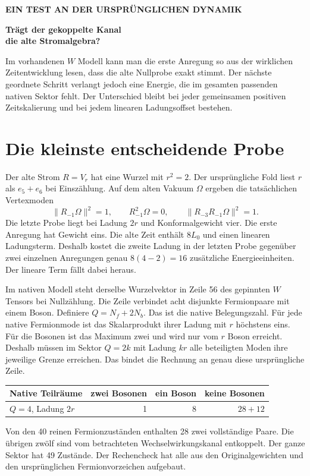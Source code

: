\documentclass[11pt,a4paper]{article}
\begin{document}
{\sffamily\bfseries\color{pine} EIN TEST AN DER URSPRÜNGLICHEN DYNAMIK\par}
\vspace{4mm}
{\sffamily\bfseries\fontsize{26}{30}\selectfont Trägt der gekoppelte Kanal\\ die alte Stromalgebra?\par}
\vspace{4mm}
Im vorhandenen $W$ Modell kann man die erste Anregung so aus der wirklichen Zeitentwicklung lesen, dass die alte Nullprobe exakt stimmt. Der nächste geordnete Schritt verlangt jedoch eine Energie, die im gesamten passenden nativen Sektor fehlt. Der Unterschied bleibt bei jeder gemeinsamen positiven Zeitskalierung und bei jedem linearen Ladungsoffset bestehen.

\section*{Die kleinste entscheidende Probe}
Der alte Strom $R=V_r$ hat eine Wurzel mit $r^2=2$. Der ursprüngliche Fold liest $r$ als $e_5+e_6$ bei Einszählung. Auf dem alten Vakuum $\Omega$ ergeben die tatsächlichen Vertexmoden
\[
 \|R_{-1}\Omega\|^2=1,\qquad R_{-1}^2\Omega=0,\qquad
 \|R_{-3}R_{-1}\Omega\|^2=1.
\]
Die letzte Probe liegt bei Ladung $2r$ und Konformalgewicht vier. Die erste Anregung hat Gewicht eins. Die alte Zeit enthält $8L_0$ und einen linearen Ladungsterm. Deshalb kostet die zweite Ladung in der letzten Probe gegenüber zwei einzelnen Anregungen genau $8(4-2)=16$ zusätzliche Energieeinheiten. Der lineare Term fällt dabei heraus.

Im nativen Modell steht derselbe Wurzelvektor in Zeile 56 des gepinnten $W$ Tensors bei Nullzählung. Die Zeile verbindet acht disjunkte Fermionpaare mit einem Boson. Definiere $Q=N_f+2N_b$. Das ist die native Belegungszahl. Für jede native Fermionmode ist das Skalarprodukt ihrer Ladung mit $r$ höchstens eins. Für die Bosonen ist das Maximum zwei und wird nur vom $r$ Boson erreicht. Deshalb müssen im Sektor $Q=2k$ mit Ladung $kr$ alle beteiligten Moden ihre jeweilige Grenze erreichen. Das bindet die Rechnung an genau diese ursprüngliche Zeile.

\begin{center}
\begin{tabular}{@{}lrrr@{}}
\toprule
Native Teilräume & zwei Bosonen & ein Boson & keine Bosonen\\
\midrule
$Q=4$, Ladung $2r$ & 1 & 8 & $28+12$\\
\bottomrule
\end{tabular}
\end{center}
Von den 40 reinen Fermionzuständen enthalten 28 zwei vollständige Paare. Die übrigen zwölf sind vom betrachteten Wechselwirkungskanal entkoppelt. Der ganze Sektor hat 49 Zustände. Der Rechencheck hat alle aus den Originalgewichten und den ursprünglichen Fermionvorzeichen aufgebaut.
\end{document}

